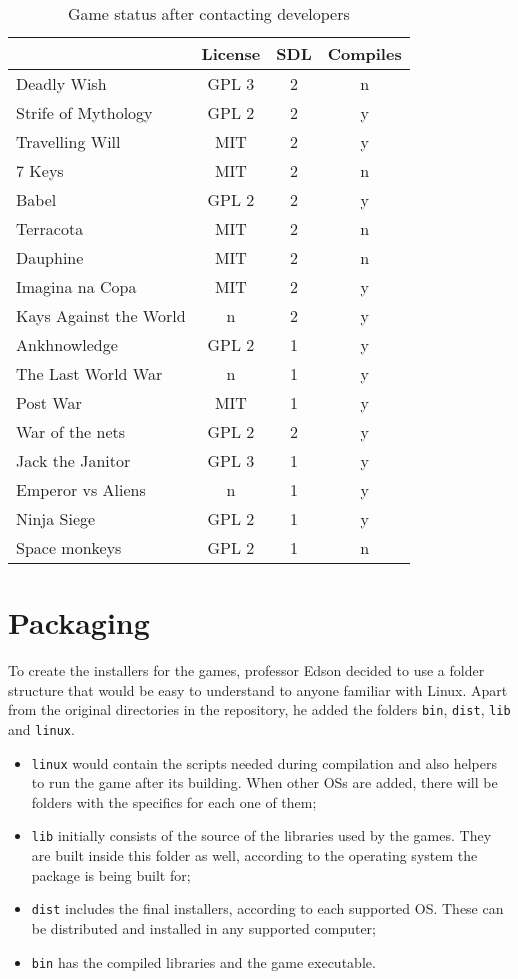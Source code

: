 \begin{table}[h!]
\centering
\caption{Game status after contacting developers}
\label{tab:final_games}
\begin{tabular}{lccc}
\toprule
\textbf{} & \multicolumn{1}{l}{\textbf{License}} & \multicolumn{1}{l}{\textbf{SDL}} & \multicolumn{1}{l}{\textbf{Compiles}} \\
\midrule
Deadly Wish & GPL 3 & 2 & n \\
Strife of Mythology & GPL 2 & 2 & y \\
Travelling Will & MIT & 2 & y \\
7 Keys & MIT & 2 & n \\
Babel & GPL 2 & 2 & y \\
Terracota & MIT & 2 & n \\
Dauphine & MIT & 2 & n \\
Imagina na Copa & MIT & 2 & y \\
Kays Against the World & n & 2 & y \\
Ankhnowledge & GPL 2 & 1 & y \\
The Last World War & n & 1 & y \\
Post War & MIT & 1 & y \\
War of the nets & GPL 2 & 2 & y \\
Jack the Janitor & GPL 3 & 1 & y \\
Emperor vs Aliens & n & 1 & y \\
Ninja Siege & GPL 2 & 1 & y \\
Space monkeys & GPL 2 & 1 & n \\
\bottomrule
\end{tabular}
\end{table}


\section{Packaging}
\label{sec:packaging}

To create the installers for the games, professor Edson decided to use a folder structure that would be easy to understand to anyone familiar with Linux. Apart from the original directories in the repository, he added the folders \texttt{bin}, \texttt{dist}, \texttt{lib} and \texttt{linux}.

\begin{itemize}
\item \texttt{linux} would contain the scripts needed during compilation and also helpers to run the game after its building. When other OSs are added, there will be folders with the specifics for each one of them;
\item \texttt{lib} initially consists of the source of the libraries used by the games. They are built inside this folder as well, according to the operating system the package is being built for;
\item \texttt{dist} includes the final installers, according to each supported OS. These can be distributed and installed in any supported computer;
\item \texttt{bin} has the compiled libraries and the game executable.

\end{itemize}


